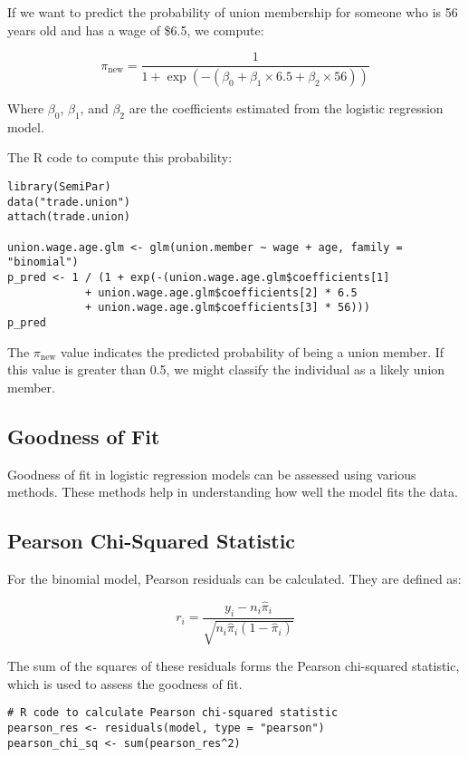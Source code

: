 \documentclass[11pt]{article}
\begin{document}
If we want to predict the probability of union membership for someone who is 56 years old and has a wage of \$6.5, we compute:

\[
\pi_{\text{new}} = \frac{1}{1 + \exp(-(\beta_0 + \beta_1 \times 6.5 + \beta_2 \times 56))}
\]

Where \(\beta_0\), \(\beta_1\), and \(\beta_2\) are the coefficients estimated from the logistic regression model.

The R code to compute this probability:

\begin{verbatim}
library(SemiPar)
data("trade.union")
attach(trade.union)

union.wage.age.glm <- glm(union.member ~ wage + age, family = "binomial")
p_pred <- 1 / (1 + exp(-(union.wage.age.glm$coefficients[1]
            + union.wage.age.glm$coefficients[2] * 6.5
            + union.wage.age.glm$coefficients[3] * 56)))
p_pred
\end{verbatim}

The \(\pi_{\text{new}}\) value indicates the predicted probability of being a union member. If this value is greater than 0.5, we might classify the individual as a likely union member.

\subsection{Goodness of Fit}

Goodness of fit in logistic regression models can be assessed using various methods. These methods help in understanding how well the model fits the data.

\subsection{Pearson Chi-Squared Statistic}

For the binomial model, Pearson residuals can be calculated. They are defined as:

\[
r_i = \frac{y_i - n_i \hat{\pi}_i}{\sqrt{n_i \hat{\pi}_i (1 - \hat{\pi}_i)}}
\]

The sum of the squares of these residuals forms the Pearson chi-squared statistic, which is used to assess the goodness of fit.

\begin{verbatim}
# R code to calculate Pearson chi-squared statistic
pearson_res <- residuals(model, type = "pearson")
pearson_chi_sq <- sum(pearson_res^2)
\end{verbatim}
\end{document}

